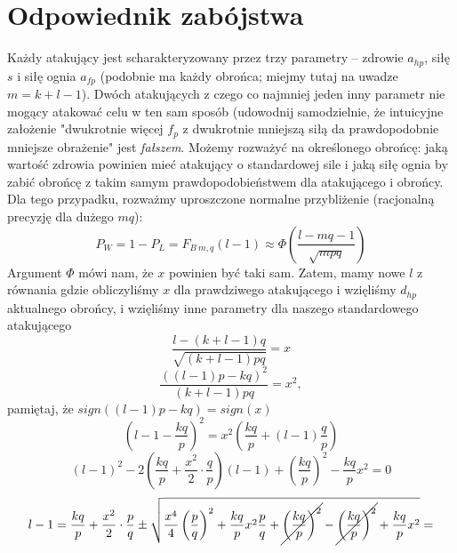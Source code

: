 \documentclass{article}
\begin{document}
\section{Odpowiednik zabójstwa}
Każdy atakujący jest scharakteryzowany przez trzy parametry -- zdrowie $a_{hp}$, siłę $s$ i siłę ognia $a_{fp}$ (podobnie ma każdy obrońca; miejmy tutaj na uwadze $m = k+l-1$). Dwóch atakujących z czego co najmniej jeden inny parametr nie mogący atakować celu w ten sam sposób (udowodnij samodzielnie, że intuicyjne założenie "dwukrotnie więcej $f_{p}$ z dwukrotnie mniejszą siłą da prawdopodobnie mniejsze obrażenie" jest \emph{fałszem}. Możemy rozważyć na określonego obrońcę: jaką wartość zdrowia powinien mieć atakujący o standardowej sile i jaką siłę ognia by zabić obrońcę z takim samym prawdopodobieństwem dla atakującego i obrońcy. Dla tego przypadku, rozważmy uproszczone normalne przybliżenie (racjonalną precyzję dla dużego $mq$):
\begin{equation*}
    P_{W} = 1 - P_{L} = F_{B \: m,q}\left(l-1\right) \approx \Phi \left(\frac{l-mq-1}{\sqrt{mpq}}\right)
\end{equation*}
Argument $\Phi$ mówi nam, że $x$ powinien być taki sam. Zatem, mamy nowe $l$ z równania gdzie obliczyliśmy $x$ dla prawdziwego atakującego i wzięliśmy $d_{hp}$ aktualnego obrońcy, i wzięliśmy inne parametry dla naszego standardowego atakującego
\begin{equation*}
    \frac{l-\left(k+l-1\right)q}{\sqrt{\left(k+l-1\right)pq}} = x
\end{equation*}
\begin{equation*}
    \frac{\left(\left(l-1\right)p-kq\right)^2}{\left(k+l-1\right)pq} = x^2,
\end{equation*}
pamiętaj, że $sign((l-1)p-kq)=sign(x)$
\begin{equation*}
    \left(l-1-\frac{kq}{p}\right)^2=x^2\left(\frac{kq}{p}+\left(l-1\right)\frac{q}{p}\right)
\end{equation*}
\begin{equation*}
    \left(l-1\right)^2 -2\left(\frac{kq}{p}+\frac{x^2}{2}\cdot\frac{q}{p}\right)\left(l-1\right)+\left(\frac{kq}{p}\right)^2-\frac{kq}{p}x^2 = 0
\end{equation*}
\begin{equation*}
    l-1 = \frac{kq}{p} + \frac{x^2}{2} \cdot \frac{p}{q} \pm 
    \sqrt{\frac{x^4}{4} \left(\frac{p}{q}\right)^2 + \frac{kq}{p}x^2\frac{p}{q} + 
    \cancel{\left(\frac{kq}{p}\right)^2} - \cancel{\left(\frac{kq}{p}\right)^2} +
    \frac{kq}{p}x^2} = 
\end{equation*}
\end{document}
